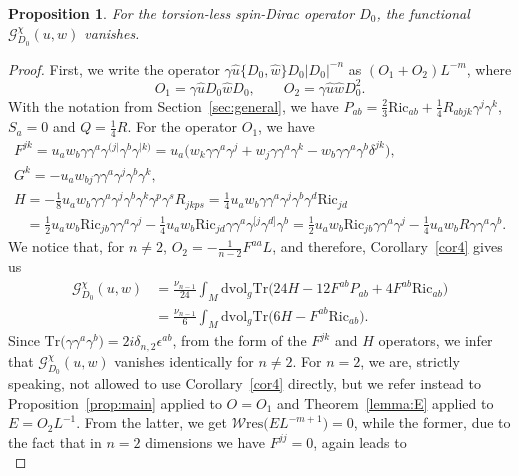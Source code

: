 \documentclass[pdftex]{sigma}
\numberwithin{equation}{section}
\newtheorem{Proposition}[Theorem]{Proposition}
\theoremstyle{definition}
\def\W{\mathscr{W} \mathrm{res}}
\def\Tr{\mathrm{Tr}}
\def\dv{\mathrm{dvol}_g}
\begin{document}
\begin{Proposition}
	For the torsion-less spin-Dirac operator $D_0$, the functional $\mathscr{G}_{D_0}^\chi(u,w)$ vanishes.
\end{Proposition}
\begin{proof}
	First, we write the operator $\gamma\hat{u}\{D_0,\hat{w}\}D_0|D_0|^{-n}$ as $(O_1+O_2)L^{-m}$, where
	\[
		O_1=\gamma\hat{u}D_0\hat{w} D_0, \qquad O_2=\gamma \hat{u}\hat{w}D_0^{2}.
	\]
	With the notation from Section~\ref{sec:general}, we have $P_{ab}=\frac{2}{3}\mathrm{Ric}_{ab}+\frac{1}{4}R_{abjk}\gamma^j\gamma^k$, $S_a=0$ and $Q=\frac{1}{4}R$. For the operator $O_1$, we have
	\begin{gather*}
			F^{jk}=u_a w_b \gamma \gamma^a \gamma^{(j|} \gamma^b \gamma^{|k)}= u_a\bigl(w_k\gamma \gamma^a \gamma^j +w_j\gamma\gamma^a\gamma^k -w_b \gamma\gamma^a\gamma^b \delta^{jk}\bigr),\\
			G^k=-u_aw_{bj}\gamma \gamma^a \gamma^j \gamma^b \gamma^k,\\
			H=-\frac{1}{8}u_a w_b \gamma \gamma^a \gamma^j \gamma^b \gamma^k \gamma^p\gamma^s R_{jkps}=\frac{1}{4}u_aw_b \gamma\gamma^a \gamma^j \gamma^b\gamma^d \mathrm{Ric}_{jd}\\
		\phantom{H}{}	=\frac{1}{2}u_aw_b \mathrm{Ric}_{jb}\gamma\gamma^a\gamma^j -\frac{1}{4}u_aw_b \mathrm{Ric}_{jd}\gamma\gamma^a \gamma^{[j}\gamma^{d]}\gamma^b	=\frac{1}{2}u_aw_b \mathrm{Ric}_{jb}\gamma\gamma^a\gamma^j -\frac{1}{4}u_a w_b R \gamma\gamma^a \gamma^b.
		\end{gather*}
	We notice that, for $n\neq 2$, $O_2=-\frac{1}{n-2}F^{aa} L$, and therefore, Corollary~\ref{cor4} gives us
	\begin{align*}
			\mathscr{G}_{D_0}^\chi(u,w)&=\frac{\nu_{n-1}}{24}\int_M\dv \Tr \bigl(24H -12F^{ab}P_{ab}+4F^{ab}\mathrm{Ric}_{ab}\bigr)\\
			&=\frac{\nu_{n-1}}{6}\int_M\dv \Tr\bigl(6H -F^{ab}\mathrm{Ric}_{ab}\bigr).
		\end{align*}
	Since $\Tr\bigl(\gamma\gamma^a\gamma^b\bigr)=2i\delta_{n,2}\epsilon^{ab}$, from the form of the $F^{jk}$ and $H$ operators, we infer that $\mathscr{G}_{D_0}^\chi(u,w)$ vanishes identically for $n\neq 2$. For $n=2$, we are, strictly speaking, not allowed to use Corollary~\ref{cor4} directly, but we refer instead to Proposition~\ref{prop:main} applied to $O=O_1$ and Theorem~\ref{lemma:E} applied to $E=O_2 L^{-1}$. From the latter, we get $\W\bigl(EL^{-m+1}\bigr)=0$, while the former, due to the fact that in $n=2$ dimensions we have $F^{jj}=0$, again leads to
	\[
\]
\end{proof}
\end{document}
